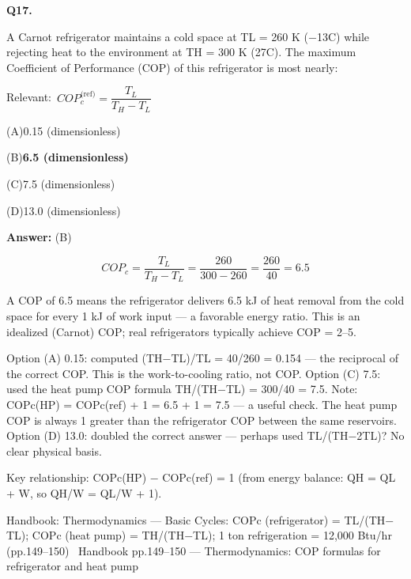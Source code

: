 \documentclass[11pt]{article}
\newcommand{\correct}[1]{\textbf{#1}\;{\color{accent}$\checkmark$}}
\newcommand{\optline}[2]{\par\noindent\hspace{1.2em}(#1)\hspace{0.6em}#2}
\begin{document}
\vspace{9pt}
\filbreak
\textbf{\color{accent}Q17.}\par\vspace{2pt}
A Carnot refrigerator maintains a cold space at TL = 260 K ($-$13\textdegree{}C) while rejecting heat to the environment at TH = 300 K (27\textdegree{}C). The maximum Coefficient of Performance (COP) of this refrigerator is most nearly:\par\vspace{3pt}
{\small\color{soft}Relevant:}\ $COP_c^{\text{(ref)}} = \dfrac{T_L}{T_H - T_L}$\par\vspace{3pt}
\optline{A}{0.15 (dimensionless)}
\optline{B}{\correct{6.5 (dimensionless)}}
\optline{C}{7.5 (dimensionless)}
\optline{D}{13.0 (dimensionless)}
\par\vspace{3pt}
\vspace{2pt}\par\noindent\colorbox{boxbg}{\parbox{\dimexpr\linewidth-2\fboxsep\relax}{%
\vspace{2pt}\textbf{Answer:} (B)\par\vspace{2pt}
{\small \[COP_c = \frac{T_L}{T_H - T_L} = \frac{260}{300 - 260} = \frac{260}{40} = 6.5\]

A COP of 6.5 means the refrigerator delivers 6.5 kJ of heat removal from the cold space for every 1 kJ of work input --- a favorable energy ratio. This is an idealized (Carnot) COP; real refrigerators typically achieve COP = 2--5.

Option (A) 0.15: computed (TH$-$TL)/TL = 40/260 = 0.154 --- the reciprocal of the correct COP. This is the work-to-cooling ratio, not COP. Option (C) 7.5: used the heat pump COP formula TH/(TH$-$TL) = 300/40 = 7.5. Note: COPc(HP) = COPc(ref) + 1 = 6.5 + 1 = 7.5 --- a useful check. The heat pump COP is always 1 greater than the refrigerator COP between the same reservoirs. Option (D) 13.0: doubled the correct answer --- perhaps used TL/(TH$-$2TL)? No clear physical basis.

Key relationship: COPc(HP) $-$ COPc(ref) = 1 (from energy balance: QH = QL + W, so QH/W = QL/W + 1).}\par\vspace{2pt}
{\footnotesize\color{soft}Handbook: Thermodynamics --- Basic Cycles: COPc (refrigerator) = TL/(TH$-$TL); COPc (heat pump) = TH/(TH$-$TL); 1 ton refrigeration = 12,000 Btu/hr (pp.149--150) \textbullet\ Handbook pp.149--150 --- Thermodynamics: COP formulas for refrigerator and heat pump}\vspace{2pt}
}}
\end{document}
